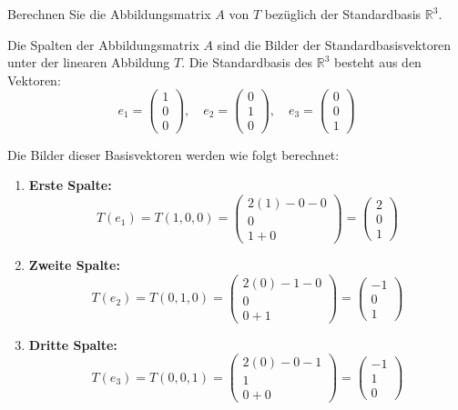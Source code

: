 Berechnen Sie die Abbildungsmatrix $A$ von $T$ bezüglich der Standardbasis
$\mathbb{R}^3$.

Die Spalten der Abbildungsmatrix \(A\) sind die Bilder der
Standardbasisvektoren unter der linearen Abbildung \(T\). Die Standardbasis des
\(\mathbb{R}^3\) besteht aus den Vektoren:
\[
    e_1 = \begin{pmatrix} 1 \\ 0 \\ 0 \end{pmatrix}, \quad
    e_2 = \begin{pmatrix} 0 \\ 1 \\ 0 \end{pmatrix}, \quad
    e_3 = \begin{pmatrix} 0 \\ 0 \\ 1 \end{pmatrix}
\]

Die Bilder dieser Basisvektoren werden wie folgt berechnet:
\begin{enumerate}
    \item \textbf{Erste Spalte:}
          \[
              T(e_1) = T(1,0,0) = \begin{pmatrix} 2(1) - 0 - 0 \\ 0 \\ 1 + 0 \end{pmatrix} = \begin{pmatrix} 2 \\ 0 \\ 1 \end{pmatrix}
          \]

    \item \textbf{Zweite Spalte:}
          \[
              T(e_2) = T(0,1,0) = \begin{pmatrix} 2(0) - 1 - 0 \\ 0 \\ 0 + 1 \end{pmatrix} = \begin{pmatrix} -1 \\ 0 \\ 1 \end{pmatrix}
          \]

    \item \textbf{Dritte Spalte:}
          \[
              T(e_3) = T(0,0,1) = \begin{pmatrix} 2(0) - 0 - 1 \\ 1 \\ 0 + 0 \end{pmatrix} = \begin{pmatrix} -1 \\ 1 \\ 0 \end{pmatrix}
          \]
\end{enumerate}

